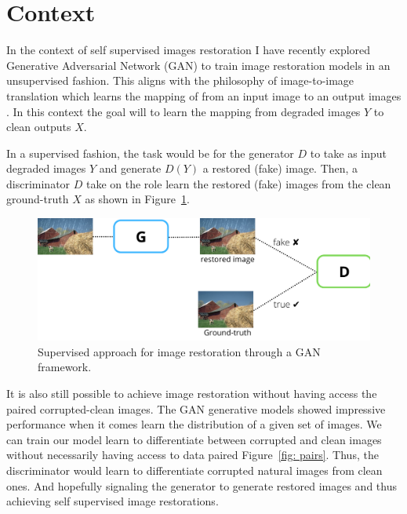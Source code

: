 \section{Context}
\label{sec: Context}
In the context of self supervised images restoration I have recently explored Generative Adversarial Network (GAN) to train image restoration models in an unsupervised fashion. This aligns with the philosophy of image-to-image translation which learns the mapping of from an input image to an output images \cite{isola2017image}. In this context the goal will to learn the mapping from degraded images $Y$ to clean outputs $X$.
\par In a supervised fashion, the task would be for the generator $D$ to take as input degraded images $Y$ and generate $D(Y)$ a restored (fake) image. Then, a discriminator $D$ take on the role learn the restored (fake) images from the clean ground-truth $X$ as shown in Figure~\ref{fig: sup_GAN}.
\begin{figure}[h]
    \label{fig: sup_GAN}
    \centering
    \includegraphics[scale=0.23]{./figures/sup_GAN.png}
    \caption{Supervised approach for image restoration through a GAN framework.}
\end{figure}
\par It is also still possible to achieve image restoration without having access the paired corrupted-clean images. The GAN generative models showed impressive performance when it comes learn the distribution of a given set of images. We can train our model learn to differentiate between corrupted and clean images without necessarily having access to data paired Figure~\ref{fig: pairs}. Thus, the discriminator would learn to differentiate corrupted natural images from clean ones. And hopefully signaling the generator to generate restored images and thus achieving self supervised image restorations.
